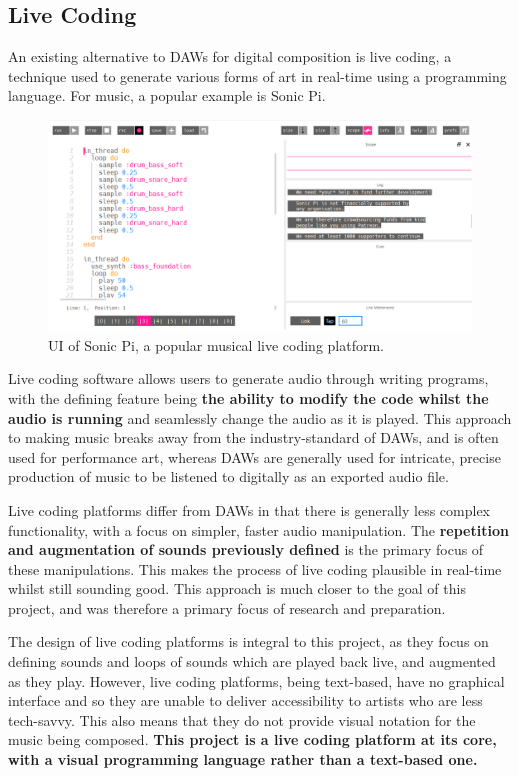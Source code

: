 \documentclass[12pt,a4paper,oneside,openright]{report}
\begin{document}
\subsection{Live Coding}
An existing alternative to DAWs for digital composition is live coding, a technique used to generate various forms of art in real-time using a programming language. For music, a popular example is Sonic Pi.

\begin{figure}[h]
    \centering
    \includegraphics[scale=0.4]{images/sonicpi.png}
    \caption{UI of Sonic Pi, a popular musical live coding platform.}
    \label{fig:sonic_pi}
\end{figure}

Live coding software allows users to generate audio through writing programs, with the defining feature being \textbf{the ability to modify the code whilst the audio is running} and seamlessly change the audio as it is played. This approach to making music breaks away from the industry-standard of DAWs, and is often used for performance art, whereas DAWs are generally used for intricate, precise production of music to be listened to digitally as an exported audio file.

Live coding platforms differ from DAWs in that there is generally less complex functionality, with a focus on simpler, faster audio manipulation. The \textbf{repetition and augmentation of sounds previously defined} is the primary focus of these manipulations. This makes the process of live coding plausible in real-time whilst still sounding good. This approach is much closer to the goal of this project, and was therefore a primary focus of research and preparation.

The design of live coding platforms is integral to this project, as they focus on defining sounds and loops of sounds which are played back live, and augmented as they play. However, live coding platforms, being text-based, have no graphical interface and so they are unable to deliver accessibility to artists who are less tech-savvy. This also means that they do not provide visual notation for the music being composed. \textbf{This project is a live coding platform at its core, with a visual programming language rather than a text-based one.}
\end{document}
